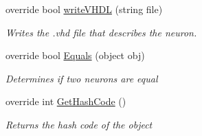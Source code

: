 \begin{DoxyCompactItemize}
override bool \hyperlink{class_n_n_gen_1_1_async_neuron_a8877af523d2fb9a4e55e74d17eb0d081}{write\+V\+H\+D\+L} (string file)
\begin{DoxyCompactList}\small\item\em Writes the .vhd file that describes the neuron. \end{DoxyCompactList}\item 
override bool \hyperlink{class_n_n_gen_1_1_async_neuron_ac096c73ce466fa58932a14ad68d0648b}{Equals} (object obj)
\begin{DoxyCompactList}\small\item\em Determines if two neurons are equal \end{DoxyCompactList}\item 
override int \hyperlink{class_n_n_gen_1_1_async_neuron_a4cc474f3e3bd5d36fbd47a6aa8b8c68f}{Get\+Hash\+Code} ()
\begin{DoxyCompactList}\small\item\em Returns the hash code of the object \end{DoxyCompactList}\end{DoxyCompactItemize}
